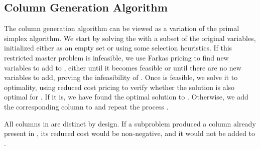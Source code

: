 \subsection{Column Generation Algorithm}\label{sec:cg_bp_cg_alg}
The column generation algorithm can be viewed as a variation of the primal simplex algorithm. We start by solving the \MP{} with a subset of the original variables, initialized either as an empty set or using some selection heuristics. If this restricted master problem \RMP{} is infeasible, we use Farkas pricing to find new variables to add to \RMP{}, either until it becomes feasible or until there are no new variables to add, proving the infeasibility of \MP{}. Once \RMP{} is feasible, we solve it to optimality, using reduced cost pricing to verify whether the solution is also optimal for \MP{}. If it is, we have found the optimal solution to \MP{}. Otherwise, we add the corresponding column to \RMP{} and repeat the process \cite{thebook}.

\begin{note}\label{note:distinct_columns}
	All columns in \RMP{} are distinct by design. If a subproblem produced a column already present in \RMP{}, its reduced cost would be non-negative, and it would not be added to \RMP{}.
\end{note}
